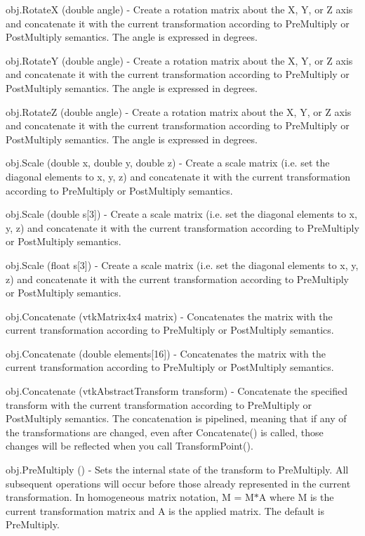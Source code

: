 \begin{DoxyItemize}
\item {\ttfamily obj.\-Rotate\-X (double angle)} -\/ Create a rotation matrix about the X, Y, or Z axis and concatenate it with the current transformation according to Pre\-Multiply or Post\-Multiply semantics. The angle is expressed in degrees.  
\item {\ttfamily obj.\-Rotate\-Y (double angle)} -\/ Create a rotation matrix about the X, Y, or Z axis and concatenate it with the current transformation according to Pre\-Multiply or Post\-Multiply semantics. The angle is expressed in degrees.  
\item {\ttfamily obj.\-Rotate\-Z (double angle)} -\/ Create a rotation matrix about the X, Y, or Z axis and concatenate it with the current transformation according to Pre\-Multiply or Post\-Multiply semantics. The angle is expressed in degrees.  
\item {\ttfamily obj.\-Scale (double x, double y, double z)} -\/ Create a scale matrix (i.\-e. set the diagonal elements to x, y, z) and concatenate it with the current transformation according to Pre\-Multiply or Post\-Multiply semantics.  
\item {\ttfamily obj.\-Scale (double s\mbox{[}3\mbox{]})} -\/ Create a scale matrix (i.\-e. set the diagonal elements to x, y, z) and concatenate it with the current transformation according to Pre\-Multiply or Post\-Multiply semantics.  
\item {\ttfamily obj.\-Scale (float s\mbox{[}3\mbox{]})} -\/ Create a scale matrix (i.\-e. set the diagonal elements to x, y, z) and concatenate it with the current transformation according to Pre\-Multiply or Post\-Multiply semantics.  
\item {\ttfamily obj.\-Concatenate (vtk\-Matrix4x4 matrix)} -\/ Concatenates the matrix with the current transformation according to Pre\-Multiply or Post\-Multiply semantics.  
\item {\ttfamily obj.\-Concatenate (double elements\mbox{[}16\mbox{]})} -\/ Concatenates the matrix with the current transformation according to Pre\-Multiply or Post\-Multiply semantics.  
\item {\ttfamily obj.\-Concatenate (vtk\-Abstract\-Transform transform)} -\/ Concatenate the specified transform with the current transformation according to Pre\-Multiply or Post\-Multiply semantics. The concatenation is pipelined, meaning that if any of the transformations are changed, even after Concatenate() is called, those changes will be reflected when you call Transform\-Point().  
\item {\ttfamily obj.\-Pre\-Multiply ()} -\/ Sets the internal state of the transform to Pre\-Multiply. All subsequent operations will occur before those already represented in the current transformation. In homogeneous matrix notation, M = M$\ast$\-A where M is the current transformation matrix and A is the applied matrix. The default is Pre\-Multiply.  

\end{DoxyItemize}
